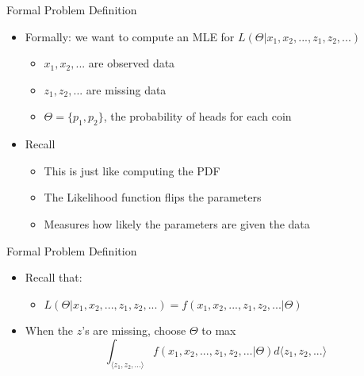 \documentclass[aspectratio=169]{beamer}
\begin{document}
\begin{frame}{Formal Problem Definition}

\begin{itemize}
\item Formally: we want to compute an MLE for $L (\Theta | x_1, x_2, ..., z_1, z_2, ...)$
	\begin{itemize}
	\item $x_1, x_2, ...$ are observed data
	\item $z_1, z_2, ...$ are missing data
	\item $\Theta = \{p_1, p_2\}$, the probability of heads for each coin
	\end{itemize}
\item Recall
	\begin{itemize}
	\item This is just like computing the PDF
	\item The Likelihood function flips the parameters
	\item Measures how likely the parameters are given the data
	\end{itemize}

\end{itemize}


\end{frame}

\begin{frame}{Formal Problem Definition}

\begin{itemize}
\item Recall that:
	\begin{itemize}
	\item $L (\Theta | x_1, x_2, ..., z_1, z_2, ...) = f (x_1, x_2, ..., z_1, z_2, ... | \Theta)$
	\end{itemize}
\item When the $z$'s are missing, choose $\Theta$ to max 
	$$\int_{\langle z_1, z_2, ...\rangle} f (x_1, x_2, ..., z_1, z_2, ... | \Theta) d\langle z_1,z_2,...\rangle$$
\end{itemize}
\end{frame}
\end{document}
